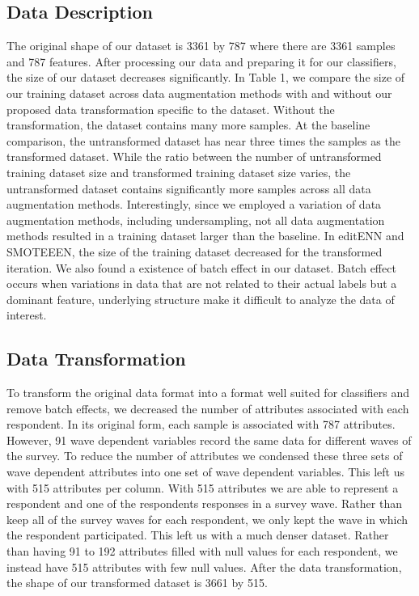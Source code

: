 \subsection{Data Description}
The original shape of our dataset is 3361 by 787 where there are 3361 samples and 787 features. After processing our data and preparing it for our classifiers, the size of our dataset decreases significantly. In Table 1, we compare the size of our training dataset across data augmentation methods with and without our proposed data transformation specific to the dataset. Without the transformation, the dataset contains many more samples. At the baseline comparison, the untransformed dataset has near three times the samples as the transformed dataset. While the ratio between the number of untransformed training dataset size and transformed training dataset size varies, the untransformed dataset contains significantly more samples across all data augmentation methods. Interestingly, since we employed a variation of data augmentation methods, including undersampling, not all data augmentation methods resulted in a training dataset larger than the baseline. In editENN and SMOTEEEN, the size of the training dataset decreased for the transformed iteration. We also found a existence of batch effect in our dataset. Batch effect occurs when variations in data that are not related to their actual labels but a dominant feature, underlying structure make it difficult to analyze the data of interest. 

\subsection{Data Transformation}
To transform the original data format into a format well suited for classifiers and remove batch effects, we decreased the number of attributes associated with each respondent. In its original form, each sample is associated with 787 attributes. However, 91 wave dependent variables record the same data for different waves of the survey. To reduce the number of attributes we condensed these three sets of wave dependent attributes into one set of wave dependent variables. This left us with 515 attributes per column. With 515 attributes we are able to represent a respondent and one of the respondents responses in a survey wave. Rather than keep all of the survey waves for each respondent, we only kept the wave in which the respondent participated. This left us with a much denser dataset. Rather than having 91 to 192 attributes filled with null values for each respondent, we instead have 515 attributes with few null values. After the data transformation, the shape of our transformed dataset is 3661 by 515.

